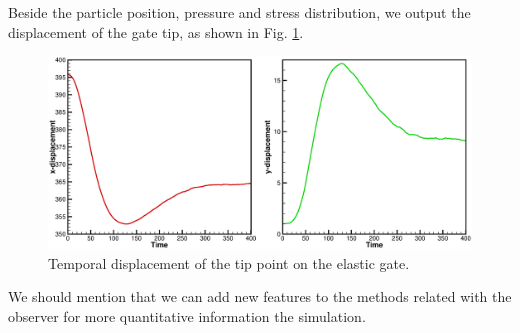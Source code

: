 \documentclass[12pt, a4paper,onecolumn]{article}
\begin{document}
Beside the particle position, pressure and stress distribution, 
we output the displacement of the gate tip,
as shown in Fig. \ref{figs:elastic-gate-tip}.
%
\begin{figure}[tb!]
	\centering
	\includegraphics[width=\textwidth]{figs/displacement.eps}
	\caption{Temporal displacement of the tip point on the elastic gate.}
	\label{figs:elastic-gate-tip}
\end{figure}
%
We should mention that we can add new features 
to the methods related with the observer for more quantitative information the simulation.



\end{document}
